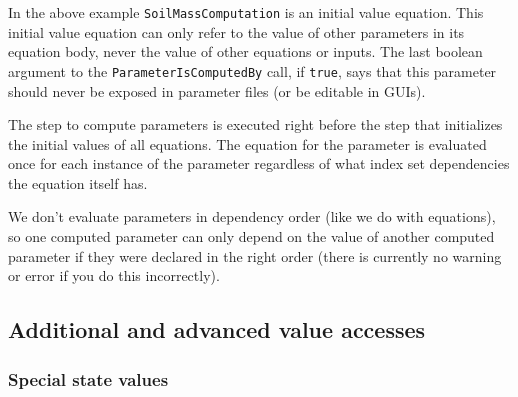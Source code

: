 \documentclass[11pt]{article}
\theoremstyle{definition}
\begin{document}
In the above example {\tt SoilMassComputation} is an initial value equation. This initial value equation can only refer to the value of other parameters in its equation body, never the value of other equations or inputs. The last boolean argument to the {\tt ParameterIsComputedBy} call, if {\tt true}, says that this parameter should never be exposed in parameter files (or be editable in GUIs).

The step to compute parameters is executed right before the step that initializes the initial values of all equations. The equation for the parameter is evaluated once for each instance of the parameter regardless of what index set dependencies the equation itself has.

We don't evaluate parameters in dependency order (like we do with equations), so one computed parameter can only depend on the value of another computed parameter if they were declared in the right order (there is currently no warning or error if you do this incorrectly).

\subsection{Additional and advanced value accesses}\label{sec:advancedaccess}

\subsubsection{Special state values}
\end{document}

